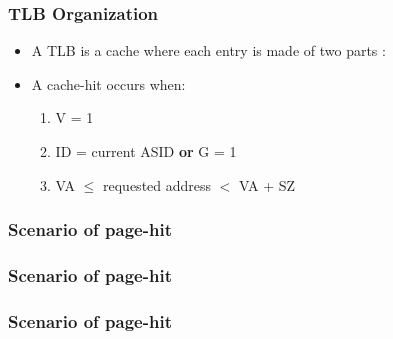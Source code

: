 
\begin{frame}
  \frametitle{TLB Organization}

    \begin{itemize}
      \item A TLB is a cache where each entry is made of two parts :

      \begin{center}
      \end{center}

      \item A cache-hit occurs when:
      \begin{enumerate}
      \item
        V = 1
      \item
        ID = current ASID \textbf{or} G = 1
      \item
        VA $\leq$ requested address $<$ VA + SZ
      \end{enumerate}
    \end{itemize}
\end{frame}


\begin{frame}
  \frametitle{Scenario of page-hit}

  \begin{center}
  \end{center}

\end{frame}


\begin{frame}
  \frametitle{Scenario of page-hit}

  \begin{center}
  \end{center}

\end{frame}


\begin{frame}
  \frametitle{Scenario of page-hit}

  \begin{center}
  \end{center}

\end{frame}


